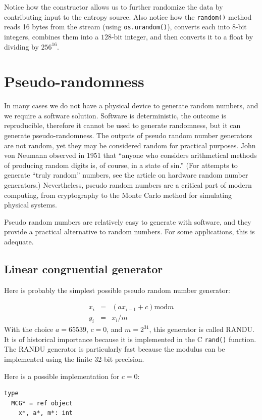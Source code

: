 \documentclass[justified, sixbynine]{tufte-book}
\def\ft{\small\tt}
\theoremstyle{plain}%
\newtheorem * {corollary}{Corollary}
\theoremstyle{definition}
\theoremstyle{remark}
\newtheorem * {remark}{Remark}
\newtheorem * {note}{Note}
\begin{document}
\begin{fullwidth}
Notice how the constructor allows us to further randomize the data by contributing input to the entropy source. Also notice how the {\ft random()} method reads 16 bytes from the stream (using {\ft os.urandom()}), converts each into $8$-bit integers, combines them into a $128$-bit integer, and then converts it to a float by dividing by $256^{16}$.

\goodbreak\section{Pseudo-randomness}

In many cases we do not have a physical device to generate random numbers,
and we require a software solution. Software is deterministic, the outcome
is reproducible, therefore it cannot be used to generate randomness, but it
can generate pseudo-randomness. The outputs of pseudo random number
generators are not random, yet they may be considered random for practical purposes.
John von Neumann observed in 1951 that ``anyone who
considers arithmetical methods of producing random digits is, of course, in
a state of sin.'' (For attempts to generate ``truly random'' numbers, see
the article on hardware random number generators.) Nevertheless,
pseudo random numbers are a critical part of modern computing, from
cryptography to the Monte Carlo method for simulating physical systems.

Pseudo random numbers are relatively easy to generate with software, and they
provide a practical alternative to random numbers. For some applications,
this is adequate.

\goodbreak\subsection{Linear congruential generator}

Here is probably the simplest possible pseudo random number generator:

\begin{eqnarray}
x_i &=&(a x_{i-1} + c) \textrm{mod}m \\
y_i &=&x_i/m
\end{eqnarray}
With the choice $a=65539$, $c=0$, and $m=2^{31}$, this generator is called RANDU. It is of historical importance
because it is implemented in the C {\ft rand()} function.
The RANDU generator is particularly fast because the modulus can
be implemented using the finite 32-bit precision.

Here is a possible implementation for $c=0$:
\begin{lstlisting}[caption={in file: {\ft nlib/randomgen.nim}}]
type
  MCG* = ref object
    x*, a*, m*: int


\end{lstlisting}
\end{fullwidth}
\end{document}
